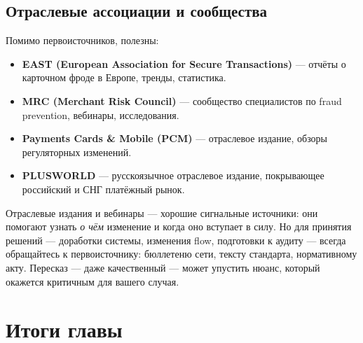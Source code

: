 \subsection*{Отраслевые ассоциации и сообщества}

Помимо первоисточников, полезны:

\begin{itemize}
  \item \textbf{EAST (European Association for Secure Transactions)} —
        отчёты о карточном фроде в Европе, тренды, статистика.
  \item \textbf{MRC (Merchant Risk Council)} — сообщество
        специалистов по fraud prevention, вебинары, исследования.
  \item \textbf{Payments Cards \& Mobile (PCM)} — отраслевое
        издание, обзоры регуляторных изменений.
  \item \textbf{PLUSWORLD} — русскоязычное отраслевое издание,
        покрывающее российский и СНГ платёжный рынок.
\end{itemize}

\begin{kaobox}[title=Важно, colback=red!5, colbacktitle=red!20]
  Отраслевые издания и вебинары — хорошие сигнальные
  источники: они помогают узнать \emph{о чём} изменение
  и когда оно вступает в силу. Но для принятия решений —
  доработки системы, изменения flow, подготовки к аудиту —
  всегда обращайтесь к первоисточнику: бюллетеню сети,
  тексту стандарта, нормативному акту. Пересказ — даже
  качественный — может упустить нюанс, который окажется
  критичным для вашего случая.
\end{kaobox}

\section*{Итоги главы}

